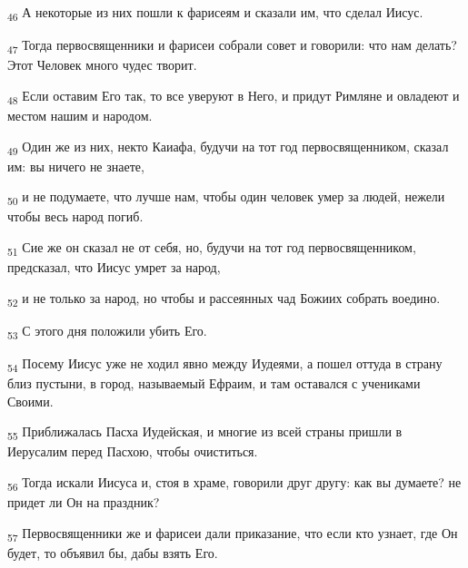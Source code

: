 \begin{tcolorbox}
\textsubscript{46} А некоторые из них пошли к фарисеям и сказали им, что сделал Иисус.
\end{tcolorbox}
\begin{tcolorbox}
\textsubscript{47} Тогда первосвященники и фарисеи собрали совет и говорили: что нам делать? Этот Человек много чудес творит.
\end{tcolorbox}
\begin{tcolorbox}
\textsubscript{48} Если оставим Его так, то все уверуют в Него, и придут Римляне и овладеют и местом нашим и народом.
\end{tcolorbox}
\begin{tcolorbox}
\textsubscript{49} Один же из них, некто Каиафа, будучи на тот год первосвященником, сказал им: вы ничего не знаете,
\end{tcolorbox}
\begin{tcolorbox}
\textsubscript{50} и не подумаете, что лучше нам, чтобы один человек умер за людей, нежели чтобы весь народ погиб.
\end{tcolorbox}
\begin{tcolorbox}
\textsubscript{51} Сие же он сказал не от себя, но, будучи на тот год первосвященником, предсказал, что Иисус умрет за народ,
\end{tcolorbox}
\begin{tcolorbox}
\textsubscript{52} и не только за народ, но чтобы и рассеянных чад Божиих собрать воедино.
\end{tcolorbox}
\begin{tcolorbox}
\textsubscript{53} С этого дня положили убить Его.
\end{tcolorbox}
\begin{tcolorbox}
\textsubscript{54} Посему Иисус уже не ходил явно между Иудеями, а пошел оттуда в страну близ пустыни, в город, называемый Ефраим, и там оставался с учениками Своими.
\end{tcolorbox}
\begin{tcolorbox}
\textsubscript{55} Приближалась Пасха Иудейская, и многие из всей страны пришли в Иерусалим перед Пасхою, чтобы очиститься.
\end{tcolorbox}
\begin{tcolorbox}
\textsubscript{56} Тогда искали Иисуса и, стоя в храме, говорили друг другу: как вы думаете? не придет ли Он на праздник?
\end{tcolorbox}
\begin{tcolorbox}
\textsubscript{57} Первосвященники же и фарисеи дали приказание, что если кто узнает, где Он будет, то объявил бы, дабы взять Его.
\end{tcolorbox}

